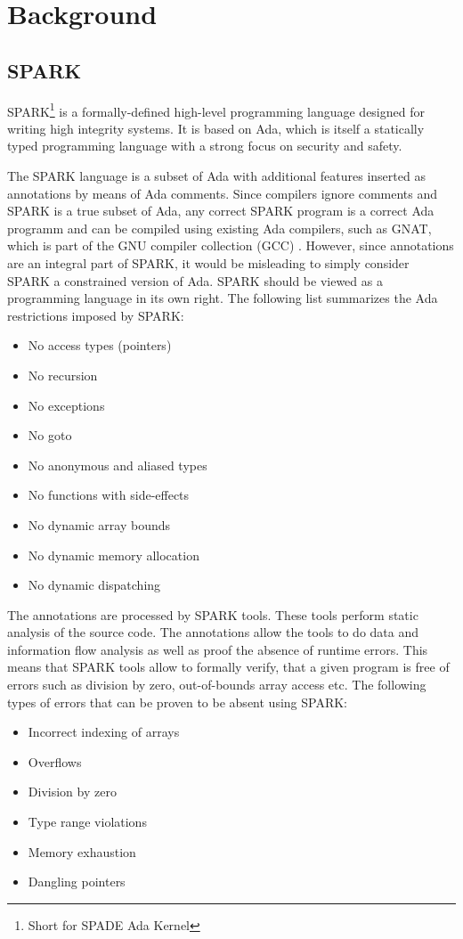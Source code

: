 \chapter{Background}
\section{SPARK}
SPARK\footnote{Short for SPADE Ada Kernel} is a formally-defined high-level
programming language designed for writing high integrity systems. It is based on
Ada, which is itself a statically typed programming language with a strong focus
on security and safety.

The SPARK language is a subset of Ada with additional features inserted as
annotations by means of Ada comments. Since compilers ignore comments and SPARK
is a true subset of Ada, any correct SPARK program is a correct Ada programm and
can be compiled using existing Ada compilers, such as GNAT, which is part of the
GNU compiler collection (GCC) \cite{gcc}. However, since annotations are an
integral part of SPARK, it would be misleading to simply consider SPARK a
constrained version of Ada. SPARK should be viewed as a programming language in
its own right. The following list summarizes the Ada restrictions imposed by
SPARK:

\begin{itemize}
	\item No access types (pointers)
	\item No recursion
	\item No exceptions
	\item No goto
	\item No anonymous and aliased types
	\item No functions with side-effects
	\item No dynamic array bounds
	\item No dynamic memory allocation
	\item No dynamic dispatching
\end{itemize}

The annotations are processed by SPARK tools. These tools perform static
analysis of the source code. The annotations allow the tools to do data and
information flow analysis as well as proof the absence of runtime errors. This
means that SPARK tools allow to formally verify, that a given program is free
of errors such as division by zero, out-of-bounds array access etc. The
following types of errors that can be proven to be absent using SPARK:

\begin{itemize}
	\item Incorrect indexing of arrays
	\item Overflows
	\item Division by zero
	\item Type range violations
	\item Memory exhaustion
	\item Dangling pointers
\end{itemize}

